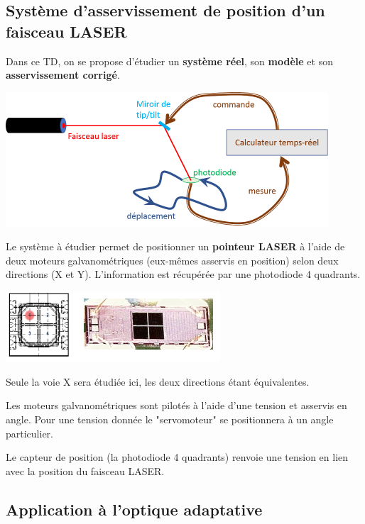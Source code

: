 \enteteThematiqueObligatoire{}
\enteteCorrection{}

\subsection*{Système d'asservissement de position d'un faisceau LASER}

Dans ce TD, on se propose d'étudier un \textbf{système réel}, son \textbf{modèle} et son \textbf{asservissement corrigé}.

\begin{center}
	\includegraphics[width=12cm]{images/TD/systBoucle.png}
\end{center}


Le système à étudier permet de positionner un \textbf{pointeur LASER} à l'aide de deux moteurs galvanométriques (eux-mêmes asservis en position) selon deux directions (X et Y). L'information est récupérée par une photodiode 4 quadrants.

\begin{center}
	\includegraphics[width=8cm]{images/TD/4q_photodiode.png}
\end{center}

Seule la voie X sera étudiée ici, les deux directions étant équivalentes.

Les moteurs galvanométriques sont pilotés à l'aide d'une tension et asservis en angle. Pour une tension donnée le "servomoteur" se positionnera à un angle particulier.

Le capteur de position (la photodiode 4 quadrants) renvoie une tension en lien avec la position du faisceau LASER.

\subsection*{Application à l'optique adaptative}

